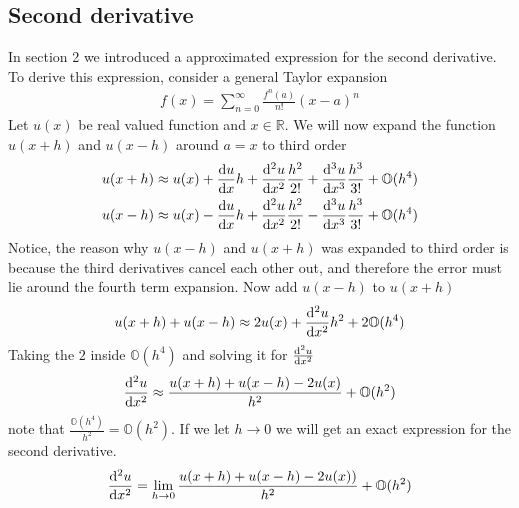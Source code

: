 \documentclass[aps,prl,reprint,toc]{revtex4-1}
\begin{document}
\subsection{Second derivative}
In section 2 we introduced a approximated expression for the second derivative. To derive this expression, consider a general Taylor expansion
\begin{align*}
f(x) = \sum_{n = 0}^{\infty}\frac{f^{n}(a)}{n!}(x-a)^{n}
\end{align*}
Let $u(x)$ be real valued function and $x\in \mathbb{R}$. We will now expand the function $u(x+h)$ and $u(x-h)$ around $a = x$
to third order
\begin{align*}
u(x+h) \approx u(x)  + \dv{u}{x}h + \dv[2]{u}{x}\frac{h^2}{2!} + \dv[3]{u}{x}\frac{h^3}{3!} + \mathbb{O}(h^4)
\\
u(x-h) \approx u(x) - \dv{u}{x}h + \dv[2]{u}{x}\frac{h^2}{2!} - \dv[3]{u}{x}\frac{h^3}{3!} + \mathbb{O}(h^4)
\end{align*}
Notice, the reason why $u(x-h)$ and $u(x+h)$ was expanded to third order is because the third derivatives cancel each other out, and therefore the error must lie around the fourth term expansion. Now add $u(x-h)$ to $u(x+h)$
\begin{align*}
u(x+h) + u(x-h) \approx 2u(x) + \dv[2]{u}{x}h^2 + 2\mathbb{O}(h^4)
\end{align*}
Taking the $2$ inside $\mathbb{O}(h^4)$ and solving it for $\dv[2]{u}{x}$
\begin{align*}
\dv[2]{u}{x} \approx \frac{u(x+h) + u(x-h) - 2u(x)}{h^2} + \mathbb{O}(h^2)
\end{align*}
note that $\frac{\mathbb{O}(h^4)}{h^2} = \mathbb{O}(h^2)$. If we let \(h \to 0\)
we will get an exact expression for the second derivative.
\begin{align*}
  \dv[2]{u}{x} = \lim_{h \to 0} \frac{u(x+h) + u(x-h) - 2u(x))}{h^{2}} + \mathbb{O}(h^{2})
\end{align*}
\end{document}
